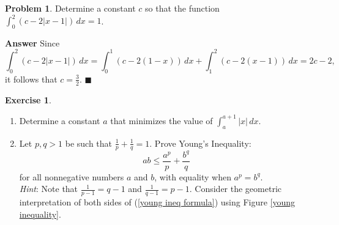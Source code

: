 \documentclass[12pt,letterpaper]{book}
\numberwithin{equation}{section}
\theoremstyle{definition}
\newtheorem{problem}[thm]{\textbf{Problem}}
\newtheorem{exercise}{\textbf{Exercise}}[chapter]
\newenvironment{answer}{\noindent\textbf{Answer}}{\hfill$\blacksquare$\vspace{0.1in}}
\begin{document}
\begin{problem} Determine a constant $c$ so that the function $\displaystyle{\int_0^2 (c-2|x-1|)\,dx=1}$.
\end{problem}

\begin{answer} Since
$$ \int_0^2 (c-2|x-1|)\,dx =\int_0^1 (c-2(1-x))\,dx + \int_1^2 (c-2(x-1))\,dx=2c-2, $$
it follows that $c=\frac{3}{2}$.
\end{answer}

\begin{exercise} \label{integral exercise}\quad
\begin{enumerate}[\bfseries 1.]
\item Determine a constant $a$ that minimizes the value of $\displaystyle{\int_a^{a+1}|x|\,dx}$.

\item Let $p,q>1$ be such that $\frac{1}{p}+\frac{1}{q}=1$. Prove Young's Inequality:
\begin{equation}\label{young ineq formula}
ab\leq \frac{a^p}{p}+\frac{b^q}{q}
\end{equation}
for all nonnegative numbers $a$ and $b$, with equality when $a^p=b^q$. \\
\textit{Hint}: Note that $\frac{1}{p-1}=q-1$ and $\frac{1}{q-1}=p-1$. Consider the geometric interpretation of both sides of (\ref{young ineq formula}) using Figure \ref{young inequality}.

\begin{figure}[h]
\begin{center}
\end{center}
\end{figure}
\end{enumerate}
\end{exercise}
\end{document}
